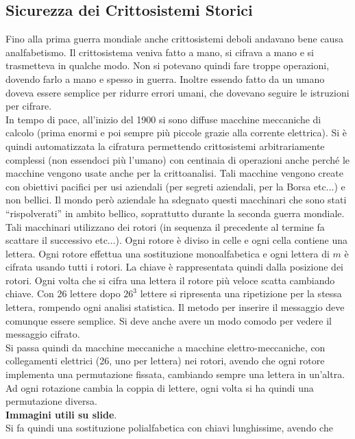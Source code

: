 \documentclass[a4paper,12pt, oneside]{book}
\begin{document}
\subsection{Sicurezza dei Crittosistemi Storici}
Fino alla prima guerra mondiale anche crittosistemi deboli andavano bene causa
analfabetismo. Il crittosistema veniva fatto a mano, si cifrava a mano e si
trasmetteva in qualche modo. Non si potevano quindi fare troppe operazioni,
dovendo farlo a mano e spesso in guerra. Inoltre essendo fatto da un umano
doveva essere semplice per ridurre errori umani, che dovevano seguire le
istruzioni per cifrare.\\
In tempo di pace, all'inizio del 1900 si sono diffuse macchine meccaniche di
calcolo (prima enormi e poi sempre più piccole grazie alla corrente
elettrica). Si è quindi automatizzata la cifratura permettendo crittosistemi
arbitrariamente complessi (non essendoci più l'umano) con centinaia di
operazioni anche perché le macchine vengono usate anche per la crittoanalisi.
Tali macchine vengono create con obiettivi pacifici per usi aziendali (per
segreti aziendali, per la Borsa etc$\ldots$) e non bellici. Il mondo però
aziendale ha sdegnato questi macchinari che sono stati ``rispolverati'' in
ambito bellico, soprattutto durante la seconda guerra mondiale.\\
Tali macchinari utilizzano dei rotori (in sequenza il precedente al termine fa
scattare il successivo etc$\ldots$). Ogni rotore è diviso in celle e ogni cella
contiene una lettera. Ogni rotore effettua una sostituzione monoalfabetica e
ogni lettera di $m$ è cifrata usando tutti i rotori. La chiave è rappresentata
quindi dalla posizione dei rotori. Ogni volta che si cifra una
lettera il rotore più veloce scatta cambiando chiave. Con 26 lettere dopo $26^3$
lettere si ripresenta una ripetizione per la stessa lettera, rompendo ogni
analisi statistica. Il metodo per inserire il messaggio deve comunque essere
semplice. Si deve anche avere un modo comodo per vedere il messaggio cifrato.\\
Si passa quindi da macchine meccaniche a macchine elettro-meccaniche, con
collegamenti elettrici (26, uno per lettera) nei rotori, avendo che ogni rotore
implementa una permutazione fissata, cambiando sempre una lettera in
un'altra. Ad ogni rotazione cambia la coppia di lettere, ogni volta si ha quindi
una permutazione diversa.\\
\textbf{Immagini utili su slide}.\\
Si fa quindi una sostituzione polialfabetica con chiavi lunghissime, avendo che
\end{document}
